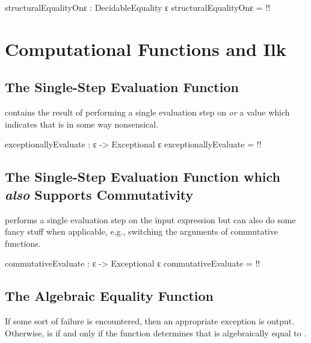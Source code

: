 \documentclass{report}
\begin{document}
\begin{code}
structuralEqualityOnε : DecidableEquality ε
structuralEqualityOnε = {!!}
\end{code}

\chapter{Computational Functions and Ilk}

\section{The Single-Step Evaluation Function}
  contains the result of performing a single evaluation step on  \emph{or} a value which indicates that  is in some way nonsensical.

\begin{code}
exceptionallyEvaluate : ε -> Exceptional ε
exceptionallyEvaluate = {!!}
\end{code}

\section{The Single-Step Evaluation Function which \emph{also} Supports Commutativity}
  performs a single evaluation step on the input expression but can also do some fancy stuff when applicable, e.g., switching the arguments of commutative functions.

\begin{code}
commutativeEvaluate : ε -> Exceptional ε
commutativeEvaluate = {!!}
\end{code}

\section{The Algebraic Equality Function}
If some sort of failure is encountered, then an appropriate exception is output.  Otherwise,    is   if and only if the function determines that  is algebraically equal to .
\end{document}
